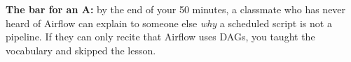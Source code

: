 \documentclass[11pt]{article}
\begin{document}
\vspace{6pt}
\begin{dobox}
\textbf{The bar for an A:} by the end of your 50 minutes, a classmate who has
never heard of Airflow can explain to someone else \emph{why} a scheduled
script is not a pipeline. If they can only recite that Airflow uses DAGs, you
taught the vocabulary and skipped the lesson.
\end{dobox}
\end{document}

